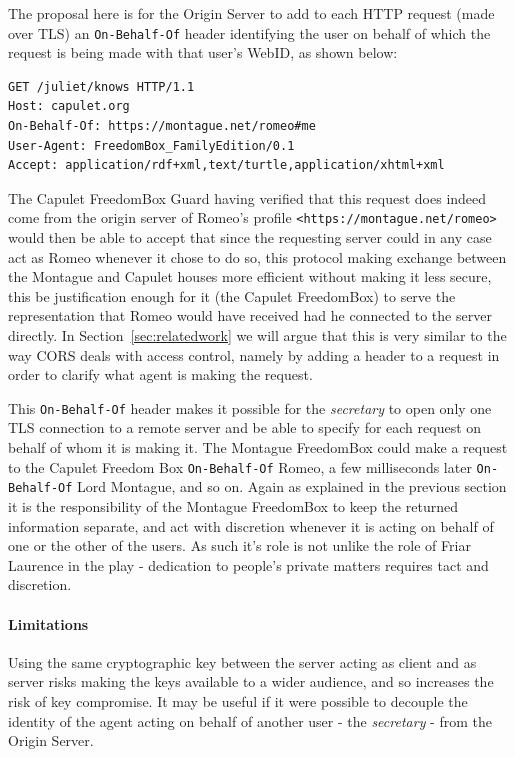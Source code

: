 \documentclass[a4paper]{llncs}
\begin{document}
The proposal here is for the Origin Server to add to each HTTP request (made over TLS) an \lstinline|On-Behalf-Of| header identifying the user on behalf of which the request is being made with that user's WebID, as shown below:

\begin{verbatim}
GET /juliet/knows HTTP/1.1
Host: capulet.org
On-Behalf-Of: https://montague.net/romeo#me
User-Agent: FreedomBox_FamilyEdition/0.1 
Accept: application/rdf+xml,text/turtle,application/xhtml+xml
\end{verbatim}

The Capulet FreedomBox Guard having verified that this request does indeed come from the origin server of Romeo's profile
\lstinline|<https://montague.net/romeo>| would then be able to accept that since the requesting server could in any case act as Romeo whenever it chose to do so, this protocol making exchange between the Montague and Capulet houses more efficient without making it less secure, this be justification enough for it (the Capulet FreedomBox) to  serve the representation that Romeo would have received had he connected to the server directly.  
In Section~\ref{sec:relatedwork} we will argue that this is very similar to the way CORS deals with access control, namely by adding a header to a request in order to clarify what agent is making the request.

This \lstinline|On-Behalf-Of| header makes it possible for the \textit{secretary} to open only one TLS connection to a remote server and be 
able to specify for each request on behalf of whom it is making it. The Montague FreedomBox could make a request to the Capulet Freedom Box \lstinline|On-Behalf-Of| Romeo, a few milliseconds later \lstinline|On-Behalf-Of| Lord Montague, and so on. 
Again as explained in the previous section it is the responsibility of the Montague FreedomBox to keep the returned information separate, and act with discretion whenever it is acting on behalf of one or the other of the users. 
As such it's role is not unlike the role of Friar Laurence in the play - dedication to people's private matters requires tact and discretion.

\paragraph{Limitations}

Using the same cryptographic key between the server acting as client and as server risks making the keys available to a wider audience, and so increases the risk of key compromise. 
It may be useful if it were possible to decouple the identity of the agent acting on behalf of another user - the \textit{secretary} - from the Origin Server.
\end{document}
